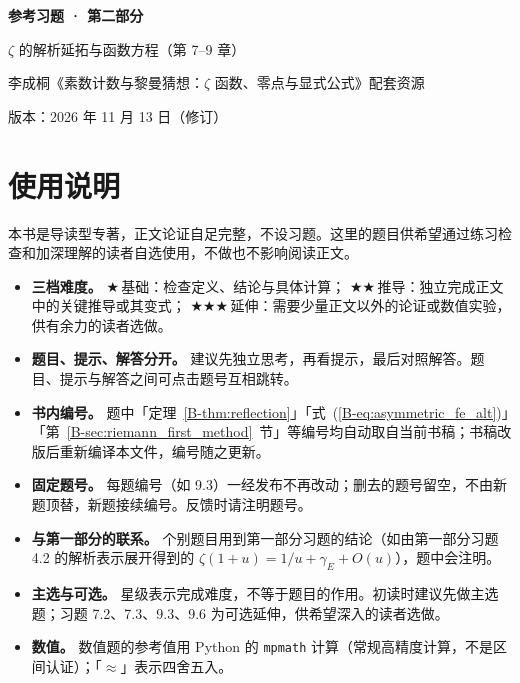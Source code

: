 \documentclass[11pt,a4paper]{article}
\newcommand{\bref}[1]{\ref*{B-#1}}
\newcommand{\lvI}{$\bigstar$\,基础}
\newcommand{\lvII}{$\bigstar\bigstar$\,推导}
\newcommand{\lvIII}{$\bigstar\bigstar\bigstar$\,延伸}
\newcommand{\versiondate}{2026 年 11 月 13 日（修订）}
\begin{document}
\begin{center}
{\LARGE\bfseries 参考习题 · 第二部分\par}
\vspace{0.6em}
{\large $\zeta$ 的解析延拓与函数方程（第 7–9 章）\par}
\vspace{0.6em}
{\normalsize 李成桐《素数计数与黎曼猜想：$\zeta$ 函数、零点与显式公式》配套资源\par}
\vspace{0.3em}
{\small 版本：\versiondate\par}
\end{center}

\vspace{0.8em}
\section*{使用说明}

本书是导读型专著，正文论证自足完整，不设习题。这里的题目供希望通过练习检查和加深理解的读者自选使用，不做也不影响阅读正文。

\begin{itemize}
  \item \textbf{三档难度。}
    \lvI：检查定义、结论与具体计算；
    \lvII：独立完成正文中的关键推导或其变式；
    \lvIII：需要少量正文以外的论证或数值实验，供有余力的读者选做。
  \item \textbf{题目、提示、解答分开。}
    建议先独立思考，再看提示，最后对照解答。题目、提示与解答之间可点击题号互相跳转。
  \item \textbf{书内编号。}
    题中「定理~\bref{thm:reflection}」「式~(\bref{eq:asymmetric_fe_alt})」「第~\bref{sec:riemann_first_method}~节」等编号均自动取自当前书稿；书稿改版后重新编译本文件，编号随之更新。
  \item \textbf{固定题号。}
    每题编号（如 9.3）一经发布不再改动；删去的题号留空，不由新题顶替，新题接续编号。反馈时请注明题号。
  \item \textbf{与第一部分的联系。}
    个别题目用到第一部分习题的结论（如由第一部分习题 4.2 的解析表示展开得到的 $\zeta(1+u)=1/u+\gamma_E+O(u)$），题中会注明。
  \item \textbf{主选与可选。}
    星级表示完成难度，不等于题目的作用。初读时建议先做主选题；习题 7.2、7.3、9.3、9.6 为可选延伸，供希望深入的读者选做。
  \item \textbf{数值。}
    数值题的参考值用 Python 的 \texttt{mpmath} 计算（常规高精度计算，不是区间认证）；「$\approx$」表示四舍五入。
\end{itemize}
\end{document}
